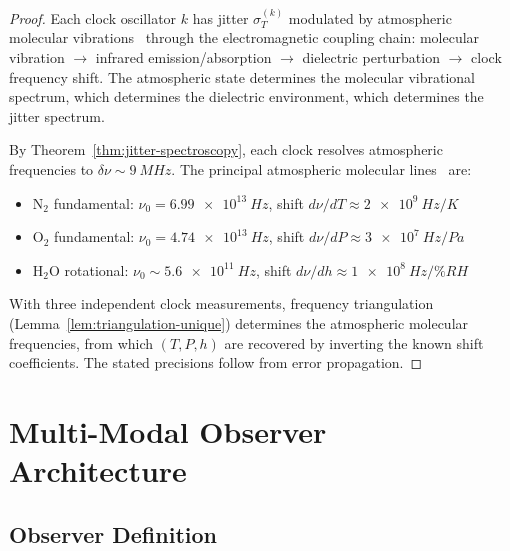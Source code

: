 \documentclass[twocolumn,10pt]{article}
\theoremstyle{definition}
\theoremstyle{remark}
\begin{document}
\begin{proof}
Each clock oscillator $k$ has jitter $\sigma_T^{(k)}$ modulated by
atmospheric molecular vibrations~\cite{herzberg1945} through the
electromagnetic coupling chain: molecular vibration $\to$ infrared
emission/absorption $\to$ dielectric perturbation $\to$ clock frequency
shift. The atmospheric state determines the molecular vibrational
spectrum, which determines the dielectric environment, which determines
the jitter spectrum.

By Theorem~\ref{thm:jitter-spectroscopy}, each clock resolves atmospheric
frequencies to $\delta\nu \sim \SI{9}{MHz}$. The principal atmospheric
molecular lines~\cite{herzberg1945,sachikonye2026atmospheric} are:
\begin{itemize}
  \item N$_2$ fundamental: $\nu_0 = \SI{6.99e13}{Hz}$, shift
    $d\nu/dT \approx \SI{2e9}{Hz/K}$
  \item O$_2$ fundamental: $\nu_0 = \SI{4.74e13}{Hz}$, shift
    $d\nu/dP \approx \SI{3e7}{Hz/Pa}$
  \item H$_2$O rotational: $\nu_0 \sim \SI{5.6e11}{Hz}$, shift
    $d\nu/dh \approx \SI{1e8}{Hz/\%RH}$
\end{itemize}

With three independent clock measurements, frequency triangulation
(Lemma~\ref{lem:triangulation-unique}) determines the atmospheric
molecular frequencies, from which $(T, P, h)$ are recovered by inverting
the known shift coefficients. The stated precisions follow from error
propagation.
\end{proof}


\section{Multi-Modal Observer Architecture}\label{sec:multimodal}

\subsection{Observer Definition}
\end{document}
